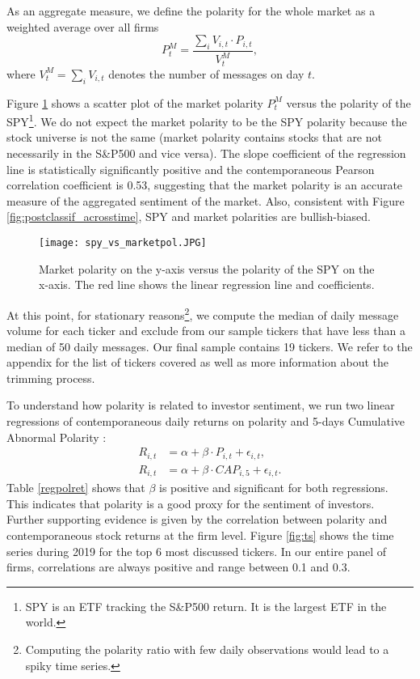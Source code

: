 As an aggregate measure, we define the polarity for the whole market as a weighted average over all firms 
\begin{equation*}
\label{marketpoleq}
    P_t^M = \dfrac{\sum_{i} V_{i,t} \cdot P_{i,t}}{V^M_t} ,
\end{equation*}
where $V^M_t = \sum_{i} V_{i,t}$ denotes the number of messages on day $t$.

Figure \ref{fig:marketpolspy} shows a scatter plot of the market polarity $P_{t}^M$ versus the polarity of the SPY\footnote{SPY is an ETF tracking the S\&P500 return. It is the largest ETF in the world.}. We do not expect the market polarity to be the SPY polarity because the stock universe is not the same (market polarity contains stocks that are not necessarily in the S\&P500 and vice versa). The slope coefficient of the regression line is statistically significantly positive and the contemporaneous Pearson correlation coefficient is 0.53, suggesting that the market polarity is an accurate measure of the aggregated sentiment of the market. Also, consistent with Figure \ref{fig:postclassif_acrosstime}, SPY and market polarities are bullish-biased.

\begin{figure}[h]
    \centering
    \texttt{[image: spy\_vs\_marketpol.JPG]}
    \caption{Market polarity on the y-axis versus the polarity of the SPY on the x-axis. The red line shows the linear regression line and coefficients.}
    \label{fig:marketpolspy}
\end{figure}

At this point, for stationary reasons\footnote{Computing the polarity ratio with few daily observations would lead to a spiky time series.}, we compute the median of daily message volume for each ticker and exclude from our sample tickers that have less than a median of 50 daily messages. Our final sample contains 19 tickers. We refer to the appendix for the list of tickers covered as well as more information about the trimming process. 

To understand how polarity is related to investor sentiment, we run two linear regressions of contemporaneous daily returns on polarity and 5-days Cumulative Abnormal Polarity :
\begin{align*}
    R_{i,t} &= \alpha + \beta \cdot P_{i,t} + \epsilon_{i,t}, \\
    R_{i,t} &= \alpha + \beta \cdot CAP_{i,5} + \epsilon_{i,t}. 
\end{align*}
Table \ref{regpolret} shows that $\beta$ is positive and significant for both regressions. This indicates that polarity is a good proxy for the sentiment of investors. Further supporting evidence is given by the correlation between polarity and contemporaneous stock returns at the firm level. Figure \ref{fig:ts} shows the time series during 2019 for the top 6 most discussed tickers. In our entire panel of firms, correlations are always positive and range between 0.1 and 0.3.

